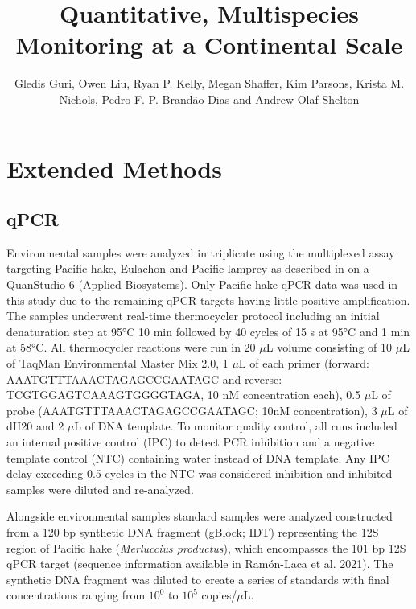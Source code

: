 \documentclass[9pt,twoside,lineno]{pnas-SI}
\title{Quantitative, Multispecies Monitoring at a Continental Scale}
\author{Gledis Guri, Owen Liu, Ryan P. Kelly, Megan Shaffer, Kim Parsons, Krista M. Nichols, Pedro F. P. Brandão-Dias and Andrew Olaf Shelton}
\begin{document}
\maketitle

\SItext

\section*{Extended Methods}
\subsection*{qPCR}
Environmental samples were analyzed in triplicate using the multiplexed assay targeting Pacific hake, Eulachon and Pacific lamprey as described in \cite{ramon-laca2021} on a QuanStudio 6 (Applied Biosystems). Only Pacific hake qPCR data was used in this study due to the remaining qPCR targets having little positive amplification. The samples underwent real-time thermocycler protocol including an initial denaturation step at 95°C 10 min followed by 40 cycles of 15 s at 95°C and 1 min at 58°C. All thermocycler reactions were run in 20 $\mu$L volume consisting of 10 $\mu$L of TaqMan Environmental Master Mix 2.0, 1 $\mu$L of each primer (forward: AAATGTTTAAACTAGAGCCGAATAGC and reverse: TCGTGGAGTCAAAGTGGGGTAGA, 10 nM concentration each), 0.5 $\mu$L of probe (AAATGTTTAAACTAGAGCCGAATAGC; 10nM concentration), 3 $\mu$L of dH20 and 2 $\mu$L of DNA template. To monitor quality control, all runs included an internal positive control (IPC) to detect PCR inhibition and a negative template control (NTC) containing water instead of DNA template. Any IPC delay exceeding 0.5 cycles in the NTC was considered inhibition and inhibited samples were diluted and re-analyzed.

Alongside environmental samples standard samples were analyzed constructed from a 120 bp synthetic DNA fragment (gBlock; IDT) representing the 12S region of Pacific hake (\textit{Merluccius productus}), which encompasses the 101 bp 12S qPCR target (sequence information available in Ramón-Laca et al. 2021). The synthetic DNA fragment was diluted to create a series of standards with final concentrations ranging from $10^{0}$ to $10^{5}$ copies/$\mu$L.
\end{document}

